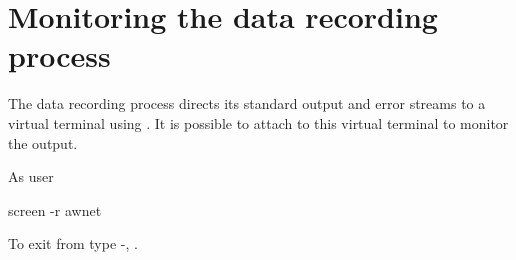 \section{Monitoring the data recording process}

The data recording process directs its standard output and error
streams to a virtual terminal using . It is possible to
attach to this virtual terminal to monitor the output.

As user \piUser
\begin{Cmd}
screen -r awnet
\end{Cmd}

To exit from  type -,
. 





